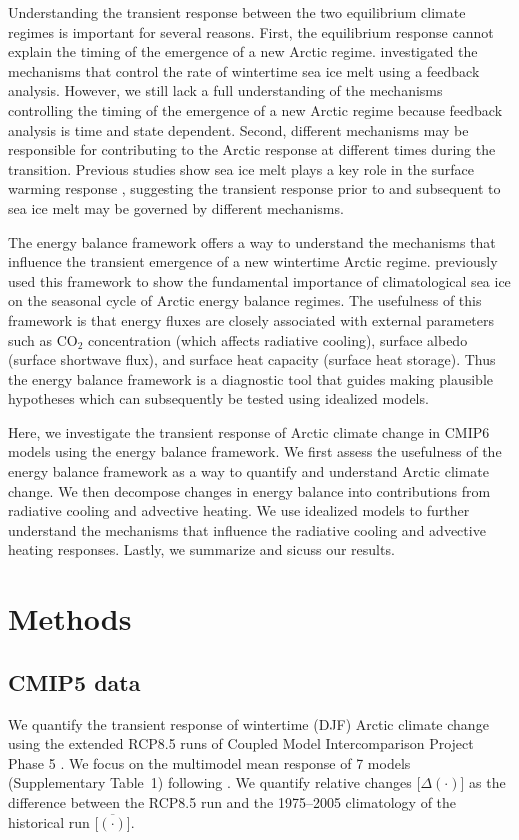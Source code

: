 \documentclass[draft]{agujournal2019}
\begin{document}
Understanding the transient response between the two equilibrium climate regimes is important for several reasons. First, the equilibrium response cannot explain the timing of the emergence of a new Arctic regime.  investigated the mechanisms that control the rate of wintertime sea ice melt using a feedback analysis. However, we still lack a full understanding of the mechanisms controlling the timing of the emergence of a new Arctic regime because feedback analysis is time and state dependent. Second, different mechanisms may be responsible for contributing to the Arctic response at different times during the transition. Previous studies show sea ice melt plays a key role in the surface warming response \cite{boeke2018, dai2019, feldl2020}, suggesting the transient response prior to and subsequent to sea ice melt may be governed by different mechanisms. 

The energy balance framework offers a way to understand the mechanisms that influence the transient emergence of a new wintertime Arctic regime. \cite{miyawaki2022} previously used this framework to show the fundamental importance of climatological sea ice on the seasonal cycle of Arctic energy balance regimes. The usefulness of this framework is that energy fluxes are closely associated with external parameters such as CO$_2$ concentration (which affects radiative cooling), surface albedo (surface shortwave flux), and surface heat capacity (surface heat storage). Thus the energy balance framework is a diagnostic tool that guides making plausible hypotheses which can subsequently be tested using idealized models.

Here, we investigate the transient response of Arctic climate change in CMIP6 models using the energy balance framework. We first assess the usefulness of the energy balance framework as a way to quantify and understand Arctic climate change. We then decompose changes in energy balance into contributions from radiative cooling and advective heating. We use idealized models to further understand the mechanisms that influence the radiative cooling and advective heating responses. Lastly, we summarize and sicuss our results.

\section{Methods}
\label{sec:met}
\subsection{CMIP5 data}
We quantify the transient response of wintertime (DJF) Arctic climate change using the extended RCP8.5 runs of Coupled Model Intercomparison Project Phase 5 \cite<CMIP5,>[]{meinshausen2011,taylor2012}. We focus on the multimodel mean response of 7 models (Supplementary Table~1) following . We quantify relative changes [$\Delta(\cdot)$] as the difference between the RCP8.5 run and the 1975--2005 climatology of the historical run [$\overline{(\cdot)}$].
\end{document}
